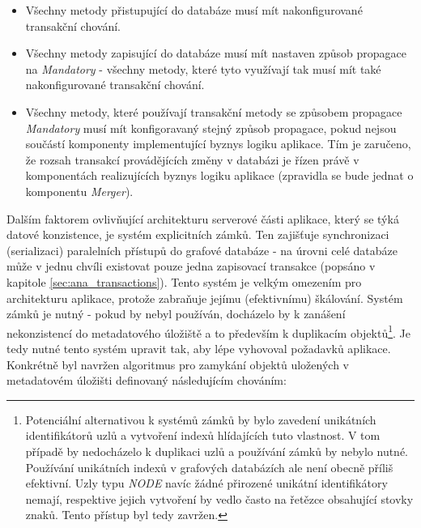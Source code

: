 \begin{itemize}
   \item Všechny metody přistupující do databáze musí mít nakonfigurované transakční chování.
   \item Všechny metody zapisující do databáze musí mít nastaven způsob propagace na \textit{Mandatory} - všechny metody,
   které tyto využívají tak musí mít také nakonfigurované transakční chování.
   \item Všechny metody, které používají transakční metody se způsobem propagace \textit{Mandatory} musí mít konfigoravaný
   stejný způsob propagace, pokud nejsou součástí komponenty implementující byznys logiku aplikace. Tím je zaručeno, že rozsah
   transakcí provádějících změny v databázi je řízen právě v komponentách realizujících byznys logiku aplikace (zpravidla se bude jednat o komponentu \textit{Merger}).
\end{itemize}


Dalším faktorem ovlivňující architekturu serverové části aplikace, který se týká datové konzistence, je systém explicitních zámků. Ten zajišťuje synchronizaci (serializaci) paralelních přístupů do grafové databáze - na úrovni celé databáze může v jednu chvíli existovat pouze jedna zapisovací transakce (popsáno v kapitole \ref{sec:ana_transactions}). Tento systém je velkým omezením pro architekturu aplikace, protože zabraňuje jejímu (efektivnímu) škálování. Systém zámků je nutný - pokud by nebyl používán, docházelo by k zanášení nekonzistencí do metadatového úložiště a to především k duplikacím objektů\footnote{Potenciální alternativou k systémů zámků by bylo zavedení unikátních identifikátorů uzlů a vytvoření indexů hlídajících tuto vlastnost. V tom případě by nedocházelo k duplikaci uzlů a používání zámků by nebylo nutné. Používání unikátních indexů v grafových databázích ale není obecně příliš efektivní. Uzly typu \textit{NODE} navíc žádné přirozené unikátní identifikátory nemají, respektive jejich vytvoření by vedlo často na řetězce obsahující stovky znaků. Tento přístup byl tedy zavržen.}. Je tedy nutné tento systém upravit tak, aby lépe vyhovoval požadavků aplikace. Konkrétně byl navržen algoritmus pro zamykání objektů uložených v metadatovém úložišti definovaný následujícím chováním:

